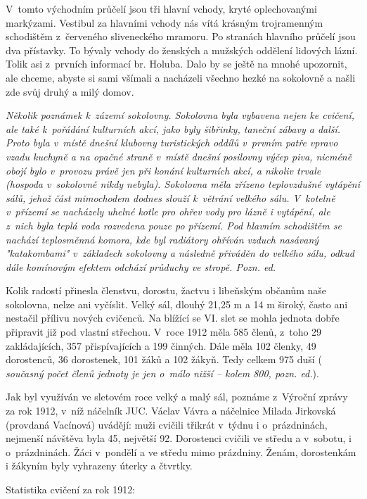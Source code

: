 \documentclass[a5paper, 11pt, twoside]{article}
\newcommand{\pozned}[1]{%
\textit{#1}}
\begin{document}
V~tomto východním průčelí jsou tři hlavní vchody, kryté oplechovanými
markýzami. Vestibul za hlavními vchody nás vítá krásným trojramenným
schodištěm z~červeného sliveneckého mramoru. Po stranách hlavního
průčelí jsou dva přístavky. To bývaly vchody do ženských a mužských
oddělení lidových lázní. Tolik asi z~prvních informací br. Holuba. Dalo
by se ještě na mnohé upozornit, ale chceme, abyste si sami všímali a
nacházeli všechno hezké na sokolovně a našli zde svůj druhý a milý
domov.

\pozned{Několik poznámek k~zázemí sokolovny. Sokolovna byla vybavena nejen
ke cvičení, ale také k~pořádání kulturních akcí, jako byly šibřinky,
taneční zábavy a další. Proto byla v~místě dnešní klubovny turistických
oddílů v~prvním patře vpravo vzadu kuchyně a na opačné straně v~místě
dnešní posilovny výčep piva, nicméně obojí bylo v~provozu právě jen při
konání kulturních akcí, a nikoliv trvale (hospoda v~sokolovně nikdy
nebyla). Sokolovna měla zřízeno teplovzdušné vytápění sálů, jehož část
mimochodem dodnes slouží k~větrání velkého sálu. V~kotelně v~přízemí se
nacházely uhelné kotle pro ohřev vody pro lázně i vytápění, ale z~nich
byla teplá voda rozvedena pouze po přízemí. Pod hlavním schodištěm se
nachází teplosměnná komora, kde byl radiátory ohříván vzduch nasávaný
"katakombami" v~základech sokolovny a následně přiváděn do velkého
sálu, odkud dále komínovým efektem odchází průduchy ve stropě. Pozn.
ed.}

Kolik radostí přinesla členstvu, dorostu, žactvu i libeňským občanům
naše sokolovna, nelze ani vyčíslit. Velký sál, dlouhý 21,25 m a 14 m
široký, často ani nestačil přílivu nových cvičenců. Na blížící se VI.
slet se mohla jednota dobře připravit již pod vlastní střechou. V~roce
1912 měla 585 členů, z~toho 29 zakládajících, 357 přispívajících a 199
činných. Dále měla 102 členky, 49 dorostenců, 36 dorostenek, 101 žáků a
102 žákyň. Tedy celkem 975 duší (\pozned{současný počet členů jednoty je
jen o~málo nižší -- kolem 800, pozn. ed.}).

Jak byl využíván ve sletovém roce velký a malý sál, poznáme z~Výroční
zprávy za rok 1912, v~níž náčelník JUC. Václav Vávra a náčelnice Milada
Jirkovská (provdaná Vacínová) uvádějí: muži cvičili třikrát v~týdnu i
o~prázdninách, nejmenší návštěva byla 45, největší 92. Dorostenci cvičili
ve středu a v~sobotu, i o~prázdninách. Žáci v~pondělí a ve středu mimo
prázdniny. Ženám, dorostenkám i žákyním byly vyhrazeny úterky a čtvrtky.

Statistika cvičení za rok 1912:
\end{document}

